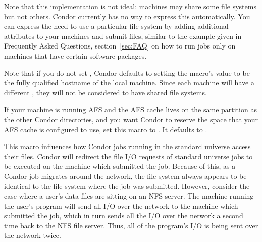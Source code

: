 \begin{description}

  Note that this implementation is not ideal: machines may share some
  file systems but not others. Condor currently has no way to express
  this automatically. You can express the need to use a
  particular file system by adding additional attributes to your machines
  and submit files, similar to the example given in 
  Frequently Asked Questions, 
  section~\ref{sec:FAQ} on
  how to run jobs only on machines that have 
  certain software packages.

  Note that if you do not set 
  , Condor defaults
  to setting the macro's value to be the fully qualified hostname
  of the local machine.
  Since each machine will have a different
  ,
  they will not be considered to have shared file systems.

  
  
\item[\Macro{RESERVE\_AFS\_CACHE}] \label{param:ReserveAfsCache} If
  your machine is running AFS and the AFS cache lives on the same
  partition as the other Condor directories, and you want Condor to
  reserve the space that your AFS cache is configured to use, set this
  macro to .  It defaults to .
  
\item[\Macro{USE\_NFS}] \label{param:UseNfs} This macro influences
  how Condor jobs running in the standard universe access their
  files.  Condor will redirect the file I/O requests
  of standard universe jobs to be executed on the machine which
  submitted the job.  Because of this, as a Condor job migrates around
  the network, the file system always appears to be identical to the
  file system where the job was submitted.  However, consider the case
  where a user's data files are sitting on an NFS server. The machine
  running the user's program will send all I/O over the network to the
  machine which submitted the job, which in turn sends all the I/O
  over the network a second time back to the NFS file server. Thus,
  all of the program's I/O is being sent over the network twice.
  

\end{description}
